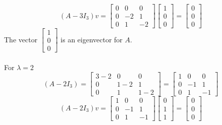 \documentclass[12pt]{article}
\begin{document}
\begin{equation*}
    (A - 3 I_3)v =
    \begin{bmatrix}
        0 & 0 & 0 \\
        0 &  - 2 & 1 \\
        0 & 1 &  - 2
    \end{bmatrix} 
     \begin{bmatrix}
        1 \\
        0 \\
        0
    \end{bmatrix}
    =
    \begin{bmatrix}
        0 \\
        0 \\
        0
    \end{bmatrix} 
\end{equation*}
The vector $\begin{bmatrix}
     1 \\
        0 \\
        0
\end{bmatrix}$ 
is an eigenvector for $A$.\\\\
For $\lambda = 2$
\begin{equation*}
    (A-2I_3) =
    \begin{bmatrix}
        3 - 2 & 0 & 0 \\
        0 & 1 - 2 & 1 \\
        0 & 1 & 1 - 2
    \end{bmatrix} 
    =
     \begin{bmatrix}
        1 & 0 & 0 \\
        0 &  - 1 & 1 \\
        0 & 1 &  - 1
    \end{bmatrix}
\end{equation*}
\begin{equation*}
    (A-2I_3)v =
     \begin{bmatrix}
        1 & 0 & 0 \\
        0 &  - 1 & 1 \\
        0 & 1 &  - 1
    \end{bmatrix}
    \begin{bmatrix}
        0 \\
        1 \\
        1
    \end{bmatrix}
    =
    \begin{bmatrix}
        0 \\
        0 \\
        0
    \end{bmatrix} 
\end{equation*}
\end{document}
